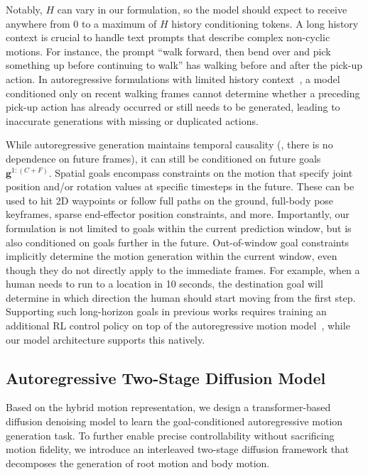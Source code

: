 Notably, $H$ can vary in our formulation, so the model should expect to receive anywhere from 0 to a maximum of $H$ history conditioning tokens. 
A long history context is crucial to handle text prompts that describe complex non-cyclic motions. For instance, the prompt ``walk forward, then bend over and pick something up before continuing to walk'' has walking before and after the pick-up action. In autoregressive formulations with limited history context~\cite{wu2025uniphys,tevet2025closd,zhao2025DartControl}, a model conditioned only on recent walking frames cannot determine whether a preceding pick-up action has already occurred or still needs to be generated, leading to inaccurate generations with missing or duplicated actions.

While autoregressive generation maintains temporal causality (\ie, there is no dependence on future frames), it can still be conditioned on future goals $\mathbf{g}^{1:(C+F)}$. 
Spatial goals encompass constraints on the motion that specify joint position and/or rotation values at specific timesteps in the future.
These can be used to hit 2D waypoints or follow full paths on the ground, full-body pose keyframes, sparse end-effector position constraints, and more.
Importantly, our formulation is not limited to goals within the current prediction window, but is also conditioned on goals further in the future. 
Out-of-window goal constraints implicitly determine the motion generation within the current window, even though they do not directly apply to the immediate frames. For example, when a human needs to run to a location in 10 seconds, the destination goal will determine in which direction the human should start moving from the first step. 
Supporting such long-horizon goals in previous works requires training an additional RL control policy on top of the autoregressive motion model~\cite{shi2024amdm,zhao2025DartControl}, while our model architecture supports this natively.





\subsection{Autoregressive Two-Stage Diffusion Model}
\label{sec:diffusion}
Based on the hybrid motion representation, we design a transformer-based diffusion denoising model to  learn the goal-conditioned autoregressive motion generation task. To further enable precise controllability without sacrificing motion fidelity, we introduce an interleaved two-stage diffusion framework that decomposes the generation of root motion and body motion.


